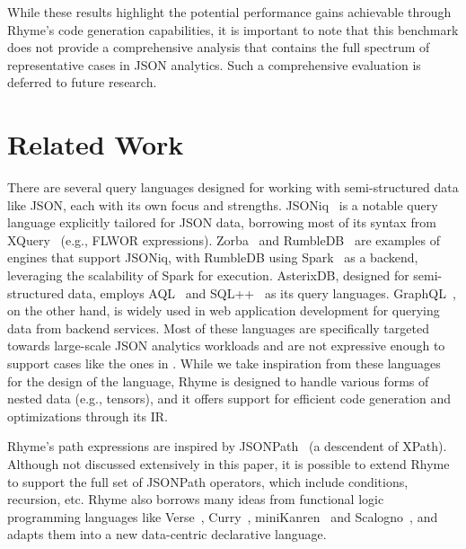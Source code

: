 \documentclass[runningheads]{llncs}
\newcommand{\lang}{Rhyme}
\begin{document}
While these results highlight the potential performance gains achievable
through \lang{}'s code generation capabilities, it is important to note
that this benchmark does not provide a comprehensive analysis that contains the
full spectrum of representative cases in JSON analytics.
Such a comprehensive evaluation is deferred to future research.

\vspace{-4mm}
\section{Related Work}\label{sec:related_work}
\vspace{-3mm}
There are several query languages designed for working with semi-structured data like
JSON, each with its own focus and strengths.
JSONiq~\cite{jsoniq,jsoniq_paper} is a notable query language explicitly tailored for
JSON data, borrowing most of its syntax from XQuery~\cite{xquery} (e.g., FLWOR expressions).
Zorba~\cite{zobra} and RumbleDB~\cite{rumble_vldb} are examples of engines that support
JSONiq, with RumbleDB using Spark~\cite{spark} as a backend, leveraging the scalability
of Spark for execution.
AsterixDB, designed for semi-structured data, employs AQL~\cite{aql} and SQL++~\cite{sqlpp}
as its query languages.
GraphQL~\cite{graphql}, on the other hand, is widely used in web application development
for querying data from backend services.
Most of these languages are specifically targeted towards large-scale JSON analytics workloads
and are not expressive enough to support cases like the ones
in .
While we take inspiration from these languages for the design of the language,
\lang{} is designed to handle various forms of nested data (e.g., tensors),
and it offers support for efficient code generation and optimizations
through its IR.

\lang{}'s path expressions are inspired by JSONPath~\cite{jsonpath} (a descendent of XPath).
Although not discussed extensively in this paper, it is possible to extend \lang{} to support
the full set of JSONPath operators, which include conditions, recursion, etc.
\lang{} also borrows many ideas from functional logic programming languages like
Verse~\cite{verse}, Curry~\cite{curry}, miniKanren~\cite{miniKanren_thesis} and 
Scalogno~\cite{scalango}, and adapts them into a new data-centric declarative language.
\end{document}
